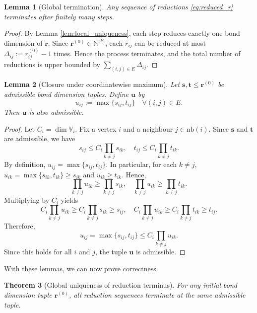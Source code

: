 \documentclass{amsart}
\theoremstyle{plain}
\newtheorem{theorem}{Theorem}[section]
\newtheorem{lemma}[theorem]{Lemma}
\theoremstyle{definition}
\theoremstyle{remark}
\begin{document}
\begin{lemma}[Global termination]
    Any sequence of reductions \eqref{eq:reduced_r} terminates after finitely many steps.
\end{lemma}

\begin{proof}
By Lemma \ref{lem:local_uniqueness}, each step reduces exactly one bond dimension of $\mathbf r$. Since $\mathbf r^{(0)}\in \mathbb N^{|E|}$, each $r_{ij}$ can be reduced at most $\Delta_{ij} := r_{ij}^{(0)} - 1$ times. Hence the process terminates, and the total number of reductions is upper bounded by
$
    \sum_{(i,j)\in E} \Delta_{ij}.
$
\end{proof}

\begin{lemma}[Closure under coordinatewise maximum]\label{lem:max_tuple}
Let $\mathbf s,\mathbf t \le \mathbf r^{(0)}$ be admissible bond dimension tuples. Define $\mathbf u$ by
\begin{equation}\label{eq:u_ij}
u_{ij} := \max\{s_{ij},t_{ij}\}
\quad \forall(i,j)\in E.
\end{equation}
Then $\mathbf u$ is also admissible.
\end{lemma}

\begin{proof}
Let $C_i=\dim\mathbb V_i$. Fix a vertex $i$ and a neighbour $j\in\mathrm{nb}(i)$.
Since $\mathbf s$ and $\mathbf t$ are admissible, we have
\[
s_{ij} \le C_i \prod_{k\ne j} s_{ik},
\quad
t_{ij} \le C_i \prod_{k\ne j} t_{ik}.
\]
By definition,
$ u_{ij} = \max\{s_{ij},t_{ij}\}.$
In particular, for each $k\ne j$,
$ u_{ik} = \max\{s_{ik},t_{ik}\} \ge s_{ik} $ and $u_{ik} \ge t_{ik}$.
Hence,
\[
    \prod_{k\ne j} u_{ik}
    \ge
    \prod_{k\ne j} s_{ik},
    \quad
    \prod_{k\ne j} u_{ik}
    \ge
    \prod_{k\ne j} t_{ik}.
\]
Multiplying by $C_i$ yields
\[
    C_i\prod_{k\ne j} u_{ik}
    \ge
    C_i\prod_{k\ne j} s_{ik}\ge s_{ij},
    \quad
    C_i\prod_{k\ne j} u_{ik}
    \ge
    C_i\prod_{k\ne j} t_{ik}\ge t_{ij}.
\]
Therefore,
\[
u_{ij}
=
\max\{s_{ij},t_{ij}\}
\le
C_i\prod_{k\ne j} u_{ik}.
\]
Since this holds for all $i$ and $j$, the tuple $\mathbf u$ is admissible.
\end{proof}

With these lemmas, we can now prove correctness.

\begin{theorem}[Global uniqueness of reduction terminus]
    For any initial bond dimension tuple $\mathbf{r}^{(0)}$, all reduction sequences terminate at the same admissible tuple.
\end{theorem}
\end{document}
